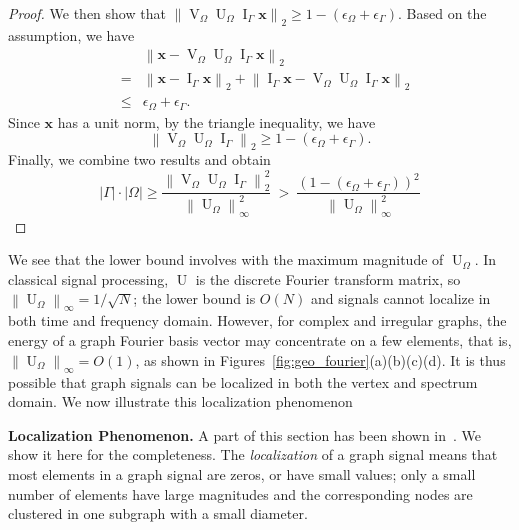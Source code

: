 \documentclass[journal,twocolumn,10pt]{IEEEtran}
\theoremstyle{definition}
\newcommand{\mypar}[1]{{\bf #1.}}
\DeclareMathOperator{\Id}{I}
\def\x{\mathbf{x}}
\DeclareMathOperator{\Vm}{V}
\DeclareMathOperator{\Um}{U}
\begin{document}
\begin{proof}
We then show that $\left\|  \Vm_{\Omega} \Um_{\Omega} \Id_{\Gamma} \x  \right\|_2 \geq 1 - (\epsilon_{\Omega}  +  \epsilon_{\Gamma} )$.
Based on the assumption, we have
   \begin{eqnarray*}
 &&  \left\| \x - \Vm_{\Omega} \Um_{\Omega} \Id_{\Gamma}  \x  \right\|_2
   \\
& = &   \left\| \x - \Id_{\Gamma} \x \right\|_2  + \left\| \Id_{\Gamma} \x -  \Vm_{\Omega} \Um_{\Omega} \Id_{\Gamma} \x  \right\|_2 
	\\
& \leq & \epsilon_{\Omega}  +  \epsilon_{\Gamma}. 
   \end{eqnarray*}
Since $\x$ has a unit norm, by the triangle inequality,  we have
   \begin{equation*}
  \left\|  \Vm_{\Omega} \Um_{\Omega} \Id_{\Gamma}  \right\|_2 \geq 1 - (\epsilon_{\Omega}  +  \epsilon_{\Gamma} ).
   \end{equation*}
Finally, we combine two results and obtain  
\begin{equation*}
|\Gamma|\cdot |\Omega|  \geq  \frac{\left\| \Vm_{\Omega} \Um_{\Omega}  \Id_{\Gamma} \right\|_2^2}{\left\| \Um_{\Omega} \right\|_{\infty}^2 } \ > \ \frac{  (1 - (\epsilon_{\Omega}  +  \epsilon_{\Gamma} ))^2 }{ \left\| \Um_{\Omega} \right\|_{\infty}^2}
\end{equation*}
\end{proof}
We see that the lower bound involves with the maximum magnitude of $\Um_{\Omega}$. In classical signal processing, $\Um$ is the discrete Fourier transform matrix, so $\left\| \Um_{\Omega} \right\|_{\infty}  = 1/\sqrt{N}$; the lower bound is $O(N)$ and signals cannot localize in both time and frequency domain. However, for complex and irregular graphs, the energy of a graph Fourier basis vector may concentrate on a few elements, that is, $\left\| \Um_{\Omega} \right\|_{\infty} = O(1)$, as shown in Figures~\ref{fig:geo_fourier}(a)(b)(c)(d). It is thus possible that  graph signals can be localized in both the vertex and spectrum domain. We now illustrate this localization phenomenon
   
 \mypar{Localization Phenomenon}
 A part of this section has been shown in~\cite{LiangCK:16}. We show it here for the completeness. The \textit{localization} of a graph signal means that most elements in a graph signal are zeros, or have small values; only a small number of elements have large magnitudes and the corresponding nodes are clustered in one subgraph with a small diameter. 

\end{document}
